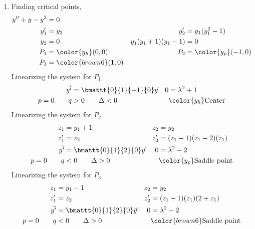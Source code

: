 \begin{enumerate}
    \item Finding critical points,
          \begin{align}
              y'' + y - y^{3}        & = 0                       \\
              y_1'                   & = y_2                   &
              y_2'                   & = y_1(y_1^{2} - 1)        \\
              y_2                    & = 0                     &
              y_1 (y_1 + 1)(y_1 - 1) & = 0                       \\
              P_1                    & = \color{y_h}(0, 0)     &
              P_2                    & = \color{y_p} (-1, 0)     \\
              P_3                    & = \color{brown6} (1, 0)
          \end{align}
          Linearizing the system for $ P_1 $
          \begin{align}
              \vec{y'}       & = \bmattt{0}{1}{-1}{0} \vec{y} &
              0              & = \lambda^{2} + 1                \\
              p = 0 \qquad q & > 0 \qquad \Delta < 0          &
                             & \color{y_h} \text{Center}
          \end{align}
          Linearizing the system for $ P_2 $
          \begin{align}
              z_1            & = y_1 + 1                       &
              z_2            & = y_2                             \\
              z_1'           & = z_2                           &
              z_2'           & = (z_1 - 1)(z_1 - 2)(z_1)         \\
              \vec{y'}       & = \bmattt{0}{1}{2}{0} \vec{y}   &
              0              & = \lambda^{2} - 2                 \\
              p = 0 \qquad q & < 0 \qquad \Delta > 0           &
                             & \color{y_p} \text{Saddle point}
          \end{align}
          Linearizing the system for $ P_3 $
          \begin{align}
              z_1            & = y_1 - 1                          &
              z_2            & = y_2                                \\
              z_1'           & = z_2                              &
              z_2'           & = (z_1 + 1)(z_1)(2 + z_1)            \\
              \vec{y'}       & = \bmattt{0}{1}{2}{0} \vec{y}      &
              0              & = \lambda^{2} - 2                    \\
              p = 0 \qquad q & < 0 \qquad \Delta > 0              &
                             & \color{brown6} \text{Saddle point}
          \end{align}


\end{enumerate}
